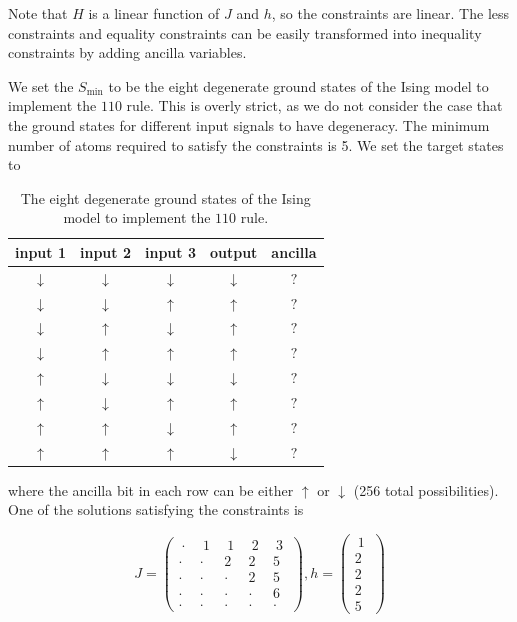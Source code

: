 \documentclass[twocolumn,superscriptaddress,english,showpacs,longbibliography]{revtex4-2}
\begin{document}
Note that $H$ is a linear function of $J$ and $h$, so the
constraints are linear. The less constraints and equality constraints
can be easily transformed into inequality constraints by adding ancilla
variables.

We set the $S_{\text{min}}$ to be the eight degenerate ground states of the Ising model to implement the $110$ rule.
This is overly strict, as we do not consider the case that the ground states for different input signals to have degeneracy.
The minimum number of atoms required to satisfy the
constraints is 5. We set the target states to

\begin{table}[H]
    \centering
\begin{tabular}{|c|c|c|c|c|}
\hline
input 1 & input 2 & input 3 & output & ancilla \\
\hline
$\downarrow$ & $\downarrow$ & $\downarrow$ & $\downarrow$ & $?$ \\
$\downarrow$ & $\downarrow$ & $\uparrow$ & $\uparrow$ & $?$ \\
$\downarrow$ & $\uparrow$ & $\downarrow$ & $\uparrow$ & $?$ \\
$\downarrow$ & $\uparrow$ & $\uparrow$ & $\uparrow$ & $?$ \\
$\uparrow$ & $\downarrow$ & $\downarrow$ & $\downarrow$ & $?$ \\
$\uparrow$ & $\downarrow$ & $\uparrow$ & $\uparrow$ & $?$ \\
$\uparrow$ & $\uparrow$ & $\downarrow$ & $\uparrow$ & $?$ \\
$\uparrow$ & $\uparrow$ & $\uparrow$ & $\downarrow$ & $?$ \\
\hline
\end{tabular}
\caption{The eight degenerate ground states of the Ising model to implement the $110$ rule.}
\end{table}

where the ancilla bit in each row can be either $\uparrow$ or
$\downarrow$ (256 total possibilities). One of the solutions
satisfying the constraints is

\begin{equation}
J = \begin{pmatrix}
~\cdot~ & ~1~ & ~1~ & ~2~ & ~3~\\
\cdot & \cdot & 2 & 2 & 5\\
\cdot & \cdot & \cdot & 2 & 5\\
\cdot & \cdot & \cdot & \cdot & 6\\
\cdot & \cdot & \cdot & \cdot & \cdot
\end{pmatrix}, h = \begin{pmatrix}
~1~\\
2\\
2\\
2\\
5
\end{pmatrix}
\end{equation}
\end{document}
